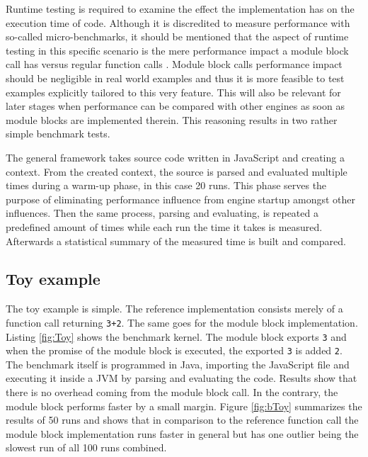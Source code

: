 Runtime testing is required to examine the effect the implementation has on the execution time of code.  Although it is discredited to measure performance with so-called micro-benchmarks, it should be mentioned that the aspect of runtime testing in this specific scenario is the mere performance impact a module block call has versus regular function calls \cite{HennessyJohnL2007Ca:a}. Module block calls performance impact should be negligible in real world examples and thus it is more feasible to test examples explicitly tailored to this very feature. This will also be relevant for later stages when performance can be compared with other engines as soon as module blocks are implemented therein. This reasoning results in two rather simple benchmark tests.

The general framework takes source code written in JavaScript and creating a context. From the created context, the source is parsed and evaluated multiple times during a warm-up phase, in this case 20 runs. This phase serves the purpose of eliminating performance influence from engine startup amongst other influences. Then the same process, parsing and evaluating, is repeated a predefined amount of times while each run the time it takes is measured. Afterwards a statistical summary of the measured time is built and compared.

\subsection{Toy example}
The toy example is simple. The reference implementation consists merely of a function call returning \texttt{3+2}. The same goes for the module block implementation. Listing \ref{fig:Toy} shows the benchmark kernel. The module block exports \texttt{3} and when the promise of the module block is executed, the exported \texttt{3} is added \texttt{2}. The benchmark itself is programmed in Java, importing the JavaScript file and executing it inside a JVM by parsing and evaluating the code. Results show that there is no overhead coming from the module block call. In the contrary, the module block performs faster by a small margin. Figure \ref{fig:bToy} summarizes the results of 50 runs and shows that in comparison to the reference function call the module block implementation runs faster in general but has one outlier being the slowest run of all 100 runs combined.

